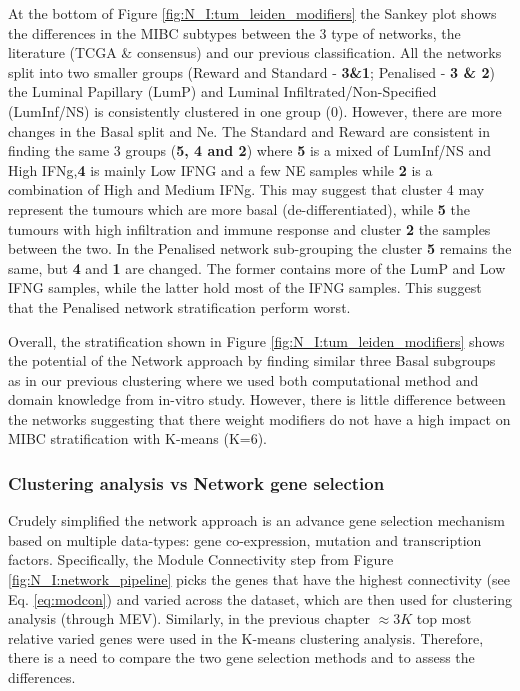 At the bottom of Figure \ref{fig:N_I:tum_leiden_modifiers} the Sankey plot shows the differences in the MIBC subtypes between the 3 type of networks, the literature (TCGA \& consensus) and our previous classification. All the networks split into two smaller groups (Reward and Standard - \textbf{3\&1}; Penalised - \textbf{3 \& 2}) the Luminal Papillary (LumP) and Luminal Infiltrated/Non-Specified (LumInf/NS) is consistently clustered in one group (0). However, there are more changes in the Basal split and Ne. The Standard and Reward are consistent in finding the same 3 groups (\textbf{5, 4 and 2}) where\textbf{ 5} is a mixed of LumInf/NS and High IFNg,\textbf{4} is mainly Low IFNG and a few NE samples while \textbf{2} is a combination of High and Medium IFNg. This may suggest that cluster 4 may represent the tumours which are more basal (de-differentiated), while \textbf{5} the tumours with high infiltration and immune response and cluster \textbf{2} the samples between the two. In the Penalised network sub-grouping the cluster \textbf{5} remains the same, but \textbf{4} and \textbf{1} are changed. The former contains more of the LumP and Low IFNG samples, while the latter hold most of the IFNG samples. This suggest that the Penalised network stratification perform worst.

Overall, the stratification shown in Figure \ref{fig:N_I:tum_leiden_modifiers} shows the potential of the Network approach by finding similar three Basal subgroups as in our previous clustering where we used both computational method and domain knowledge from in-vitro study\citet{Baker2022-bj}. However, there is little difference between the networks suggesting that there weight modifiers do not have a high impact on MIBC stratification with K-means (K=6).

\subsubsection{Clustering analysis vs Network gene selection} \label{s:N_I:cs_vs_gene_sel}

Crudely simplified the network approach is an advance gene selection mechanism based on multiple data-types: gene co-expression, mutation and transcription factors. Specifically, the Module Connectivity step from Figure \ref{fig:N_I:network_pipeline} picks the genes that have the highest connectivity (see Eq. \ref{eq:modcon}) and varied across the dataset, which are then used for clustering analysis (through MEV). Similarly, in the previous chapter $\approx3K$ top most relative varied genes were used in the K-means clustering analysis. Therefore, there is a need to compare the two gene selection methods and to assess the differences.


